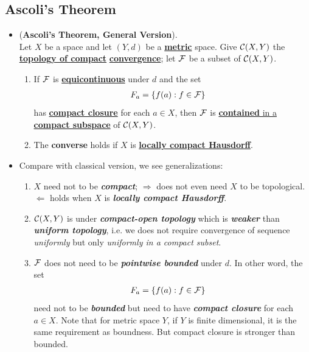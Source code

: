 \documentclass[11pt]{article}
\begin{document}
\subsection{Ascoli's Theorem}
\begin{itemize}
\item \begin{theorem} (\textbf{Ascoli's Theorem, General Version}). \citep{munkres2000topology} \\
Let $X$ be a space and let $(Y, d)$ be a \underline{\textbf{metric}} space. Give ${\mathcal C}(X, Y)$ the \underline{\textbf{topology of compact}} \underline{\textbf{convergence}}; let ${\mathcal F}$ be a subset of ${\mathcal C}(X, Y)$.
\begin{enumerate}
\item If ${\mathcal F}$ is \underline{\textbf{equicontinuous}} under $d$ and the set
\begin{align*}
F_{a} &= \left\{f(a): f \in {\mathcal F}\right\}
\end{align*}
has \underline{\textbf{compact closure}} for each $a \in X$, then ${\mathcal F}$ is \underline{\textbf{contained} in a \textbf{compact subspace}} of ${\mathcal C}(X, Y)$.
\item  The \textbf{converse} holds if $X$ is \underline{\textbf{locally compact Hausdorff}}.
\end{enumerate}
\end{theorem}

\item \begin{remark} 
Compare with classical version, we see generalizations:
\begin{enumerate}
\item $X$ need not to be \emph{\textbf{compact}}; $\Rightarrow$ does not even need $X$ to be topological. $\Leftarrow$ holds when $X$ is \textbf{\emph{locally compact Hausdorff}}.
\item ${\mathcal C}(X, Y)$ is under \emph{\textbf{compact-open topology}} which is \emph{\textbf{weaker}} than \emph{\textbf{uniform topology}}, i.e. we does not require convergence of sequence \emph{uniformly} but only \emph{uniformly in a compact subset}.
\item ${\mathcal F}$ does not need to be \emph{\textbf{pointwise bounded}} under $d$. In other word, the set 
\begin{align*}
F_{a} &= \left\{f(a): f \in {\mathcal F}\right\}
\end{align*} need not to be \emph{\textbf{bounded}} but need to have \emph{\textbf{compact closure}} for each $a \in X$. Note that for metric space $Y$, if $Y$ is finite dimensional, it is the same requirement as boundness. But compact closure is stronger than bounded.
\end{enumerate}
\end{remark}


\end{itemize}
\end{document}
